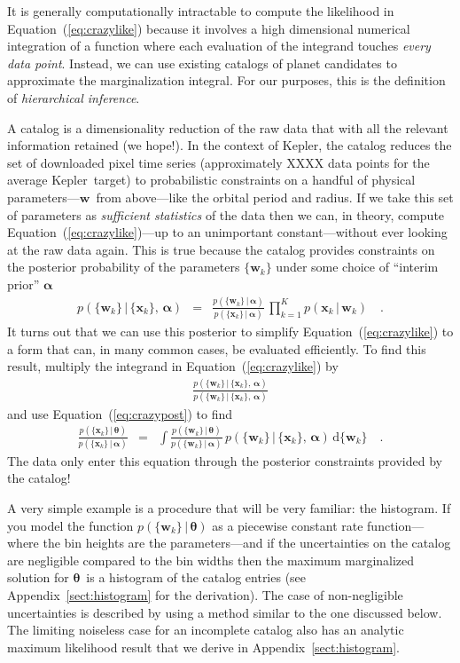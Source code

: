 \documentclass[12pt,preprint]{aastex}
\newcommand{\project}[1]{{\sffamily #1}}
\newcommand{\kepler}{\project{Kepler}}
\newcommand{\Eq}[1]{Equation~(\ref{eq:#1})}
\newcommand{\eq}[1]{\Eq{#1}}
\newcommand{\eqlabel}[1]{\label{eq:#1}}
\newcommand{\App}[1]{Appendix~\ref{sect:#1}}
\newcommand{\app}[1]{\App{#1}}
\newcommand{\dd}{\ensuremath{\,\mathrm{d}}}
\newcommand{\bvec}[1]{\ensuremath{\boldsymbol{#1}}}
\newcommand{\ratepar}{{\ensuremath{\theta}}}
\newcommand{\ratepars}{{\ensuremath{\bvec{\ratepar}}}}
\newcommand{\data}{{\ensuremath{\bvec{x}}}}
\newcommand{\entry}{{\ensuremath{\bvec{w}}}}
\newcommand{\interim}{{\ensuremath{\bvec{\alpha}}}}
\begin{document}
It is generally computationally intractable to compute the likelihood in
\eq{crazylike} because it involves a high dimensional numerical integration of
a function where each evaluation of the integrand touches \emph{every data
point}.
Instead, we can use existing catalogs of planet candidates to approximate the
marginalization integral.
For our purposes, this is the definition of \emph{hierarchical inference}.

A catalog is a dimensionality reduction of the raw data that with all the
relevant information retained (we hope!).
In the context of \kepler, the catalog reduces the set of downloaded pixel
time series (approximately XXXX data points for the average \kepler\ target)
to probabilistic constraints on a handful of physical parameters---\entry\
from above---like the orbital period and radius.
If we take this set of parameters as \emph{sufficient statistics} of the data
then we can, in theory, compute \eq{crazylike}---up to an unimportant
constant---without ever looking at the raw data again.
This is true because the catalog provides constraints on the posterior
probability of the parameters $\{\entry_k\}$ under some choice of ``interim
prior'' \interim
\begin{eqnarray}\eqlabel{crazypost}
p(\{\entry_k\}\,|\,\{\data_k\},\,\interim) &=&
\frac{p(\{\entry_k\}\,|\,\interim)}{p(\{\data_k\}\,|\,\interim)}\,
\prod_{k=1}^K p(\data_k\,|\,\entry_k) \quad.
\end{eqnarray}
It turns out that we can use this posterior to simplify \eq{crazylike} to a
form that can, in many common cases, be evaluated efficiently.
To find this result, multiply the integrand in \eq{crazylike} by
\begin{eqnarray}
\frac{p(\{\entry_k\}\,|\,\{\data_k\},\,\interim)}
     {p(\{\entry_k\}\,|\,\{\data_k\},\,\interim)}
\end{eqnarray}
and use \eq{crazypost} to find
\begin{eqnarray}
\frac{p(\{\data_k\}\,|\,\ratepars)}{p(\{\data_k\}\,|\,\interim)} &=&
    \int
    \frac{p(\{\entry_k\}\,|\,\ratepars)}{p(\{\entry_k\}\,|\,\interim)}\,
    p(\{\entry_k\}\,|\,\{\data_k\},\,\interim)
    \dd\{\entry_k\} \quad.
\end{eqnarray}
The data only enter this equation through the posterior constraints provided
by the catalog!

A very simple example is a procedure that will be very familiar: the histogram.
If you model the function $p(\{\entry_k\}\,|\,\ratepars)$ as a piecewise
constant rate function---where the bin heights are the parameters---and if the
uncertainties on the catalog are negligible compared to the bin widths then
the maximum marginalized solution for \ratepars\ is a histogram of the
catalog entries (see \app{histogram} for the derivation).
The case of non-negligible uncertainties is described by \citet{hogge} using a
method similar to the one discussed below.
The limiting noiseless case for an incomplete catalog also has an analytic
maximum likelihood result that we derive in \app{histogram}.
\end{document}
